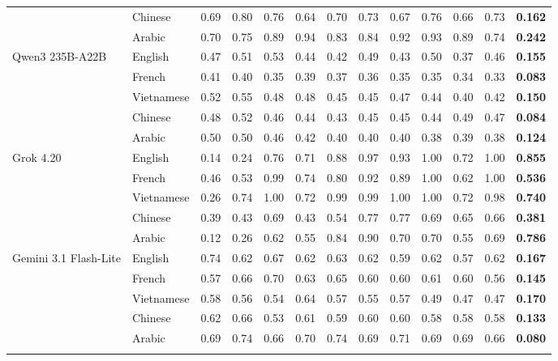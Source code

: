 \documentclass[11pt,a4paper]{article}
\begin{document}
\begin{table}[htbp]
{\begin{tabular}{@{}llccccccccccc@{}}
 & Chinese & 0.69 & 0.80 & 0.76 & 0.64 & 0.70 & 0.73 & 0.67 & 0.76 & 0.66 & 0.73 & \textbf{0.162} \\
 & Arabic & 0.70 & 0.75 & 0.89 & 0.94 & 0.83 & 0.84 & 0.92 & 0.93 & 0.89 & 0.74 & \textbf{0.242} \\
\addlinespace
Qwen3 235B-A22B & English & 0.47 & 0.51 & 0.53 & 0.44 & 0.42 & 0.49 & 0.43 & 0.50 & 0.37 & 0.46 & \textbf{0.155} \\
 & French & 0.41 & 0.40 & 0.35 & 0.39 & 0.37 & 0.36 & 0.35 & 0.35 & 0.34 & 0.33 & \textbf{0.083} \\
 & Vietnamese & 0.52 & 0.55 & 0.48 & 0.48 & 0.45 & 0.45 & 0.47 & 0.44 & 0.40 & 0.42 & \textbf{0.150} \\
 & Chinese & 0.48 & 0.52 & 0.46 & 0.44 & 0.43 & 0.45 & 0.45 & 0.44 & 0.49 & 0.47 & \textbf{0.084} \\
 & Arabic & 0.50 & 0.50 & 0.46 & 0.42 & 0.40 & 0.40 & 0.40 & 0.38 & 0.39 & 0.38 & \textbf{0.124} \\
\addlinespace
Grok 4.20 & English & 0.14 & 0.24 & 0.76 & 0.71 & 0.88 & 0.97 & 0.93 & 1.00 & 0.72 & 1.00 & \textbf{0.855} \\
 & French & 0.46 & 0.53 & 0.99 & 0.74 & 0.80 & 0.92 & 0.89 & 1.00 & 0.62 & 1.00 & \textbf{0.536} \\
 & Vietnamese & 0.26 & 0.74 & 1.00 & 0.72 & 0.99 & 0.99 & 1.00 & 1.00 & 0.72 & 0.98 & \textbf{0.740} \\
 & Chinese & 0.39 & 0.43 & 0.69 & 0.43 & 0.54 & 0.77 & 0.77 & 0.69 & 0.65 & 0.66 & \textbf{0.381} \\
 & Arabic & 0.12 & 0.26 & 0.62 & 0.55 & 0.84 & 0.90 & 0.70 & 0.70 & 0.55 & 0.69 & \textbf{0.786} \\
\addlinespace
Gemini 3.1 Flash-Lite & English & 0.74 & 0.62 & 0.67 & 0.62 & 0.63 & 0.62 & 0.59 & 0.62 & 0.57 & 0.62 & \textbf{0.167} \\
 & French & 0.57 & 0.66 & 0.70 & 0.63 & 0.65 & 0.60 & 0.60 & 0.61 & 0.60 & 0.56 & \textbf{0.145} \\
 & Vietnamese & 0.58 & 0.56 & 0.54 & 0.64 & 0.57 & 0.55 & 0.57 & 0.49 & 0.47 & 0.47 & \textbf{0.170} \\
 & Chinese & 0.62 & 0.66 & 0.53 & 0.61 & 0.59 & 0.60 & 0.60 & 0.58 & 0.58 & 0.58 & \textbf{0.133} \\
 & Arabic & 0.69 & 0.74 & 0.66 & 0.70 & 0.74 & 0.69 & 0.71 & 0.69 & 0.69 & 0.66 & \textbf{0.080} \\
\addlinespace
\bottomrule
\end{tabular}
}
\end{table}
\end{document}
